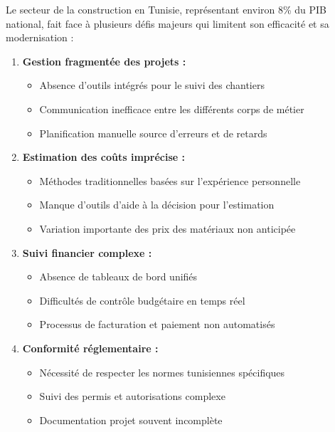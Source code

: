 \documentclass[12pt, a4paper]{report}
\begin{document}
Le secteur de la construction en Tunisie, représentant environ 8\% du PIB national, fait face à plusieurs défis majeurs qui limitent son efficacité et sa modernisation :

\begin{enumerate}
    \item \textbf{Gestion fragmentée des projets :}
    \begin{itemize}
        \item Absence d'outils intégrés pour le suivi des chantiers
        \item Communication inefficace entre les différents corps de métier
        \item Planification manuelle source d'erreurs et de retards
    \end{itemize}
    
    \item \textbf{Estimation des coûts imprécise :}
    \begin{itemize}
        \item Méthodes traditionnelles basées sur l'expérience personnelle
        \item Manque d'outils d'aide à la décision pour l'estimation
        \item Variation importante des prix des matériaux non anticipée
    \end{itemize}
    
    \item \textbf{Suivi financier complexe :}
    \begin{itemize}
        \item Absence de tableaux de bord unifiés
        \item Difficultés de contrôle budgétaire en temps réel
        \item Processus de facturation et paiement non automatisés
    \end{itemize}
    
    \item \textbf{Conformité réglementaire :}
    \begin{itemize}
        \item Nécessité de respecter les normes tunisiennes spécifiques
        \item Suivi des permis et autorisations complexe
        \item Documentation projet souvent incomplète
    \end{itemize}
\end{enumerate}
\end{document}
